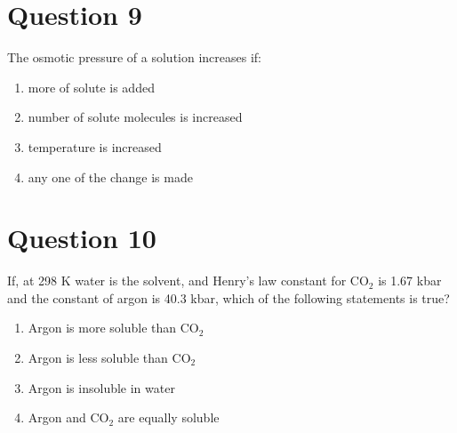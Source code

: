 \documentclass{article}
\begin{document}
\section*{Question 9}
The osmotic pressure of a solution increases if:
\begin{enumerate}[label=(\alph*)]
\item more of solute is added
\item number of solute molecules is increased
\item temperature is increased
\item any one of the change is made
\end{enumerate}
\newpage
\section*{Question 10}
If, at 298 K water is the solvent, and Henry’s law constant for CO$_{2}$ is 1.67 kbar and the constant of argon is 40.3 kbar, which of the following statements is true?
\begin{enumerate}[label=(\alph*)]
\item Argon is more soluble than CO$_{2}$
\item Argon is less soluble than CO$_{2}$
\item Argon is insoluble in water
\item Argon and CO$_{2}$ are equally soluble
\end{enumerate}
\newpage
\end{document}
